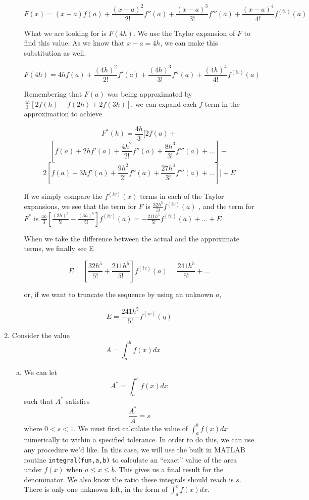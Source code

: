 \documentclass[11pt]{article}
\begin{document}
\begin{enumerate}
\begin{enumerate}[(a)]
	\[
	F(x) = (x-a)f(a) + \frac{(x-a)^2}{2!}f''(a) + \frac{(x-a)^3}{3!}f'''(a) + \frac{(x-a)^4}{4!}f^{(iv)}(a)
	\]

	What we are looking for is $F(4h)$. We use the Taylor expansion of $F$ to find this value. As we know that $x-a = 4h$, we can make this substitution as well.

	\[
	F(4h) = 4hf(a) + \frac{(4h)^2}{2!}f'(a) + \frac{(4h)^3}{3!}f''(a) + \frac{(4h)^4}{4!}f^{(iv)}(a)
	\]

	Remembering that $F(a)$ was being approximated by $\frac{4h}{3}[2f(h)-f(2h)+2f(3h)]$, we can expand each $f$ term in the approximation to achieve

	\[
	F^*(h) = \frac{4h}{3}[2f(a) +
	\]
	\[
	[f(a) + 2hf'(a) + \frac{4h^2}{2!}f''(a) + \frac{8h^3}{3!}f'''(a)+\ldots] -
	\]
	\[
	2[f(a) + 3hf'(a) + \frac{9h^2}{2!}f''(a) + \frac{27h^3}{3!}f'''(a) + \ldots]] + E
	\]

	If we simply compare the $f^{(iv)}(x)$ terms in each of the Taylor expansions, we see that the term for $F$ is
	$\frac{32h^5}{5!}f^{(iv)}(a)$
	, and the term for $F^*$ is $\frac{4h}{3}[\frac{(2h)^5}{5!} - \frac{(3h)^5}{5!}]f^{(iv)}(a) = -\frac{211h^5}{5!}f^{(iv)}(a)+\ldots+E$

	When we take the difference between the actual and the approximate terms, we finally see E

	\[
	E = [\frac{32h^5}{5!}+\frac{211h^5}{5!}]f^{(iv)}(a) = \frac{241h^5}{5!}+\ldots
	\]

	or, if we want to truncate the sequence by using an unknown $a$,

	\[
	E = \frac{241h^5}{5!}f^{(iv)}(\eta)
	\]

	\end{enumerate}

	\item Consider the value
	\[
	A = \int_{a}^{b}f(x)dx
	\]

	\begin{enumerate}[(a)]

	\item We can let
	\[
	A^* = \int_{a}^{c}f(x)dx
	\]
	such that $A^*$ satisfies
	\[
	\frac{A^*}{A} = s
	\]
	where $0<s<1$. We must first calculate the value of $\int_{a}^{b}f(x)dx$ numerically to within a specified tolerance. In order to do this, we can use any procedure we'd like. In this case, we will use the built in MATLAB routine \texttt{integral(fun,a,b)} to calculate an ``exact'' value of the area under $f(x)$ when $a\leq x \leq b$. This gives us a final result for the denominator. We also know the ratio these integrals should reach is $s$. There is only one unknown left, in the form of $\int_{a}^{c}f(x)dx$. \\


\end{enumerate}
\end{enumerate}
\end{document}
